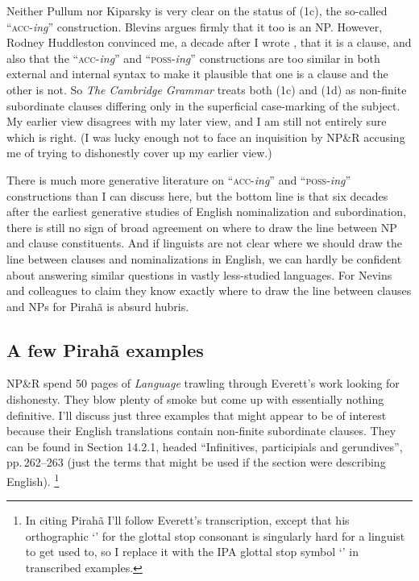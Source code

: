\documentclass[output=paper,colorlinks,citecolor=brown
]{langscibook}
\begin{document}
Neither Pullum nor Kiparsky is very clear on the status of (1c), the
so-called ``\textsc{acc}-\textit{ing}'' construction. Blevins argues
firmly that it too is an NP. However, Rodney Huddleston convinced me,
a decade after I wrote \citet{Pullum91}, that it is a clause, and also
that the ``\textsc{acc}-\textit{ing}'' and ``\textsc{poss}-\textit{ing}''
constructions are too similar in both external and internal syntax
to make it plausible that one is a clause and the other is not.
So \textit{The Cambridge Grammar} treats both (1c) and (1d) as
non-finite subordinate clauses differing only in the superficial
case-marking of the subject. My earlier view disagrees with my later
view, and I am still not entirely sure which is right. (I was
lucky enough not to face an inquisition by NP\&R accusing me of
trying to dishonestly cover up my earlier view.)

There is much more generative literature on ``\textsc{acc}-\textit{ing}''
and ``\textsc{poss}-\textit{ing}'' constructions than I can discuss here,
but the bottom line is that six decades after the earliest generative
studies of English nominalization and subordination, there is still
no sign of broad agreement on where to draw the line between NP and
clause constituents.  And if linguists are not clear where we should
draw the line between clauses and nominalizations in English, we can
hardly be confident about answering similar questions in vastly
less-studied languages. For Nevins and colleagues to claim they know
exactly where to draw the line between clauses and NPs for Pirah{\~a}
is absurd hubris.

\subsection{A few Pirah{\~a} examples}\largerpage

NP\&R spend 50 pages of \textit{Language} trawling through Everett's
work looking for dishonesty. They blow plenty of smoke but come up
with essentially nothing definitive. I'll discuss just three examples
that might appear to be of interest because their English translations
contain non-finite subordinate clauses. They can be found in
\citet{Everett86HAL} Section 14.2.1, headed ``Infinitives, participials
and gerundives'', pp.\,262--263 (just the terms that might be used if
the section were describing English).{%
   \footnote{\label{transcription}%
   In citing Pirah{\~a} I'll follow Everett's transcription, except
   that his orthographic `' for the glottal stop consonant is
   singularly hard for a linguist to get used to, so I replace it with the
   IPA glottal stop symbol `{\textglotstop}' in transcribed examples.}}
\end{document}
